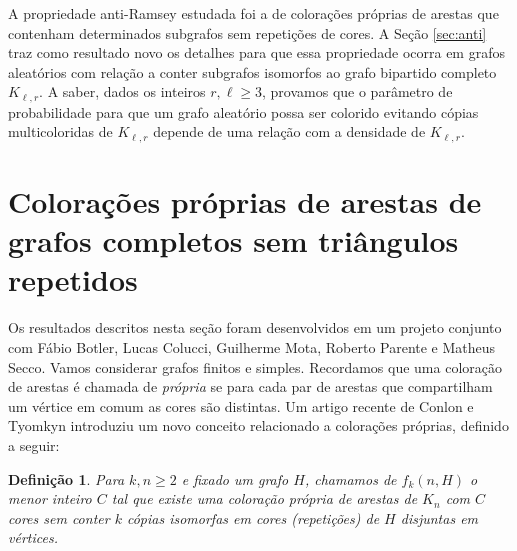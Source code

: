 \documentclass[11pt,twoside,a4paper]{book}
\newcommand{\K}{K_{\ell,r}} %
\theoremstyle{note}
\newtheorem{defi}  [teorema] {Definição}
\begin{document}
A propriedade anti-Ramsey estudada foi a de colorações próprias de arestas que contenham determinados subgrafos sem repetições de cores. 
 A Seção \ref{sec:anti} traz como resultado novo os detalhes para que essa propriedade ocorra em grafos aleatórios com relação a conter subgrafos  isomorfos ao grafo bipartido completo $\K$. 
A saber, dados os inteiros $r,\ell \geq 3$, provamos que o parâmetro de probabilidade para que um grafo aleatório possa ser colorido evitando cópias multicoloridas de $\K$ depende de uma relação com a densidade de $\K$.





\section{Colorações próprias de arestas de grafos completos sem triângulos repetidos}
\label{sec:triangles}


Os resultados descritos nesta seção foram desenvolvidos em um projeto conjunto com Fábio Botler, Lucas Colucci, Guilherme Mota, Roberto Parente e Matheus Secco.
Vamos considerar grafos finitos e simples. 
Recordamos que uma coloração de arestas é chamada de \emph{própria} se para cada par de arestas que compartilham um vértice em comum as cores são distintas. Um artigo recente de Conlon e Tyomkyn  \cite{conlontyomkyn} introduziu um novo conceito relacionado a colorações próprias, definido a seguir: 

\begin{defi}\label{def:fkn}
            Para $k,n\geq 2$ e fixado um grafo $H$, chamamos de $f_k(n,H)$ o menor inteiro $C$ tal que existe uma coloração
            própria de arestas de $K_n$ com $C$ cores sem conter $k$ cópias isomorfas em cores (\emph{repetições}) de $H$ disjuntas em vértices. 
\end{defi}
\end{document}
